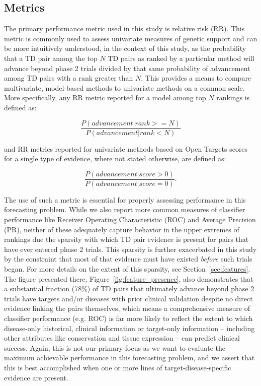 \documentclass{article}
\begin{document}
\subsection{Metrics}
\label{sec:metrics}

The primary performance metric used in this study is relative risk (RR). This metric is commonly used to assess univariate measures of genetic support \cite{Nelson2015-eg,King2019-rc,Minikel2023.06.23.23291765} and can be more intuitively understood, in the context of this study, as the probability that a TD pair among the top $N$ TD pairs as ranked by a particular method will advance beyond phase 2 trials divided by that same probability of advancement among TD pairs with a rank greater than $N$. This provides a means to compare multivariate, model-based methods to univariate methods on a common scale. More specifically, any RR metric reported for a model among top $N$ rankings is defined as:

\begin{equation}
  \frac{P(advancement | rank >= N)}{P(advancement | rank < N)}
\end{equation}

and RR metrics reported for univariate methods based on Open Targets scores for a single type of evidence, where not stated otherwise, are defined as:

\begin{equation}
  \frac{P(advancement | score > 0)}{P(advancement | score = 0)}.
\end{equation}

The use of such a metric is essential for properly assessing performance in this forecasting problem. While we also report more common measures of classifier performance like Receiver Operating Characteristic (ROC) and Average Precision (PR), neither of these adequately capture behavior in the upper extremes of rankings due the sparsity with which TD pair evidence is present for pairs that have ever entered phase 2 trials. This sparsity is further exacerbated in this study by the constraint that most of that evidence must have existed \textit{before} such trials began. For more details on the extent of this sparsity, see Section~\ref{sec:features}. The figure presented there, Figure~\ref{fig:feature_presence}, also demonstrates that a substantial fraction (78\%) of TD pairs that ultimately advance beyond phase 2 trials have targets and/or diseases with prior clinical validation despite no direct evidence linking the pairs themselves, which means a comprehensive measure of classifier performance (e.g. ROC) is far more likely to reflect the extent to which disease-only historical, clinical information or target-only information -- including other attributes like conservation and tissue expression -- can predict clinical success. Again, this is not our primary focus as we want to evaluate the maximum achievable performance in this forecasting problem, and we assert that this is best accomplished when one or more lines of target-disease-specific evidence are present.
\end{document}
